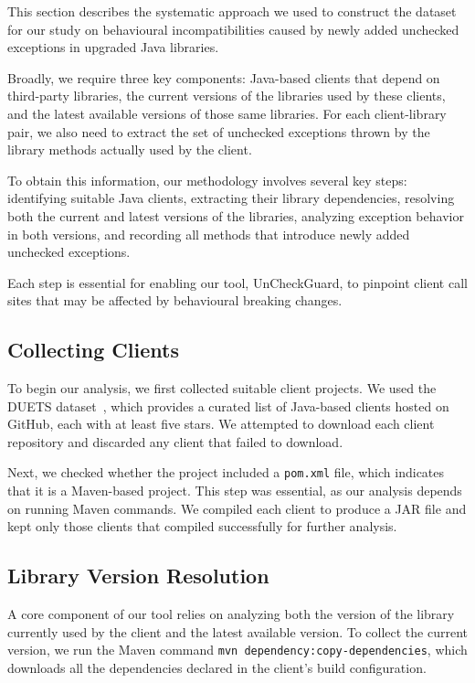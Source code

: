 This section describes the systematic approach we used to construct the dataset for our study on behavioural incompatibilities caused by newly added unchecked exceptions in upgraded Java libraries. 

Broadly, we require three key components: Java-based clients that depend on third-party libraries, the current versions of the libraries used by these clients, and the latest available versions of those same libraries. For each client-library pair, we also need to extract the set of unchecked exceptions thrown by the library methods actually used by the client.

To obtain this information, our methodology involves several key steps: identifying suitable Java clients, extracting their library dependencies, resolving both the current and latest versions of the libraries, analyzing exception behavior in both versions, and recording all methods that introduce newly added unchecked exceptions. 

Each step is essential for enabling our tool, UnCheckGuard, to pinpoint client call sites that may be affected by behavioural breaking changes.

\subsection{Collecting Clients}

To begin our analysis, we first collected suitable client projects. We used the DUETS dataset~\cite{durieux21:_duets}, which provides a curated list of Java-based clients hosted on GitHub, each with at least five stars. We attempted to download each client repository and discarded any client that failed to download.

Next, we checked whether the project included a \texttt{pom.xml} file, which indicates that it is a Maven-based project. This step was essential, as our analysis depends on running Maven commands. We compiled each client to produce a JAR file and kept only those clients that compiled successfully for further analysis.

\subsection{Library Version Resolution}

A core component of our tool relies on analyzing both the version of the library currently used by the client and the latest available version. To collect the current version, we run the Maven command \texttt{mvn dependency:copy-dependencies}, which downloads all the dependencies declared in the client's build configuration.

